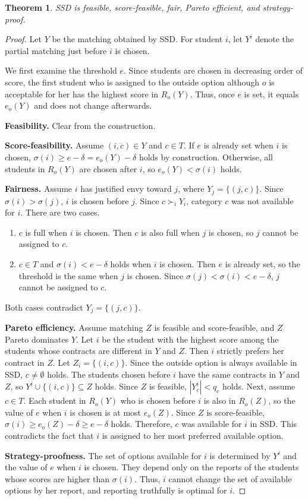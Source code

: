 \documentclass[a4paper,twoside]{article}
\newtheorem{theorem}{Theorem}
\theoremstyle{definition}
\begin{document}
\begin{theorem}
\label{thm:ssd}
SSD is feasible, score-feasible, fair, Pareto efficient, and strategy-proof.
\end{theorem}
\begin{proof}
Let $Y$ be the matching obtained by SSD.
For student $i$, let $Y^i$ denote the partial matching just before $i$ is chosen.

We first examine the threshold $e$.
Since students are chosen in decreasing order of score, the first student who is
assigned to the outside option although $o$ is acceptable for her has the highest score
in $R_o(Y)$.
Thus, once $e$ is set, it equals $e_o(Y)$ and does not change afterwards.

\textbf{Feasibility.} Clear from the construction.

\textbf{Score-feasibility.}
Assume $(i,c)\in Y$ and $c\in T$.
If $e$ is already set when $i$ is chosen, $\sigma(i)\ge e-\delta=e_o(Y)-\delta$ holds
by construction.
Otherwise, all students in $R_o(Y)$ are chosen after $i$, so $e_o(Y)<\sigma(i)$ holds.

\textbf{Fairness.}
Assume $i$ has justified envy toward $j$, where $Y_j=\{(j,c)\}$.
Since $\sigma(i)>\sigma(j)$, $i$ is chosen before $j$.
Since $c\succ_i Y_i$, category $c$ was not available for $i$.
There are two cases.
\begin{enumerate}
\item $c$ is full when $i$ is chosen.
Then $c$ is also full when $j$ is chosen, so $j$ cannot be assigned to $c$.
\item $c\in T$ and $\sigma(i)<e-\delta$ holds when $i$ is chosen.
Then $e$ is already set, so the threshold is the same when $j$ is chosen.
Since $\sigma(j)<\sigma(i)<e-\delta$, $j$ cannot be assigned to $c$.
\end{enumerate}
Both cases contradict $Y_j=\{(j,c)\}$.

\textbf{Pareto efficiency.}
Assume matching $Z$ is feasible and score-feasible, and $Z$ Pareto dominates $Y$.
Let $i$ be the student with the highest score among the students whose contracts are
different in $Y$ and $Z$.
Then $i$ strictly prefers her contract in $Z$. Let $Z_i=\{(i,c)\}$.
Since the outside option is always available in SSD, $c\neq\emptyset$ holds.
The students chosen before $i$ have the same contracts in $Y$ and $Z$, so
$Y^i\cup\{(i,c)\}\subseteq Z$ holds.
Since $Z$ is feasible, $|Y^i_c|<q_c$ holds.
Next, assume $c\in T$.
Each student in $R_o(Y)$ who is chosen before $i$ is also in $R_o(Z)$, so the value of
$e$ when $i$ is chosen is at most $e_o(Z)$.
Since $Z$ is score-feasible, $\sigma(i)\ge e_o(Z)-\delta\ge e-\delta$ holds.
Therefore, $c$ was available for $i$ in SSD.
This contradicts the fact that $i$ is assigned to her most preferred available option.

\textbf{Strategy-proofness.}
The set of options available for $i$ is determined by $Y^i$ and the value of $e$ when $i$
is chosen.
They depend only on the reports of the students whose scores are higher than $\sigma(i)$.
Thus, $i$ cannot change the set of available options by her report, and reporting
truthfully is optimal for $i$.
\end{proof}
\end{document}
